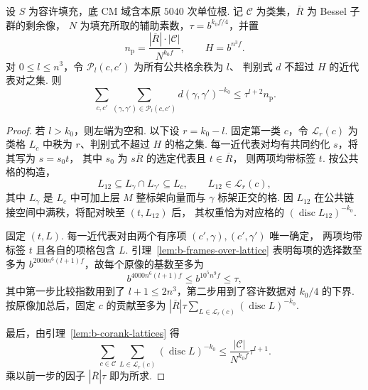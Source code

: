 \begin{lemma}[固定余秩的判别式负幂加权近代表对计数]
\label{lem:b-pair-disc-count}
\emitthmsource
设 $S$ 为容许填充，底 CM 域含本原 $5040$ 次单位根.
记 $\mathcal C$ 为类集，$\overline R$ 为 Bessel 子群的剩余像，
$N$ 为填充所取的辅助素数，$\tau=b^{k_0 f/4}$，并置
\[
 n_{\mathrm p}=\frac{|\overline R|\cdot|\mathcal C|}{N^{k_0 f}},
 \qquad H=b^{n^3 f}.
\]
对 $0\le l\le n^3$，令 $\mathcal P_l(c,c')$ 为所有公共格余秩为 $l$、
判别式 $d$ 不超过 $H$ 的近代表对之集. 则
\[
  \sum_{c,c'}\sum_{(\gamma,\gamma')\in \mathcal P_l(c,c')}
        d(\gamma,\gamma')^{-k_0}\le \tau^{l+2}n_{\mathrm p}.
\]
\end{lemma}
\begin{proof}
若 $l>k_0$，则左端为空和. 以下设 $r=k_0-l$.
固定第一类 $c$，令 $\mathcal L_r(c)$ 为类格 $L_c$ 中秩为 $r$、判别式不超过 $H$ 的格之集.
每一近代表对均有共同约化 $s$，将其写为 $s=s_0t$，
其中 $s_0$ 为 $s\overline R$ 的选定代表且 $t\in\overline R$，
则两项均带标签 $t$. 按公共格的构造，
\[
 L_{12}\subseteq L_\gamma\cap L_{\gamma'}\subseteq L_c,
 \qquad L_{12}\in\mathcal L_r(c),
\]
其中 $L_\gamma$ 是 $L_c$ 中可加上层 $M$ 整标架向量而与 $\gamma$ 标架正交的格.
因 $L_{12}$ 在公共链接空间中满秩，将配对映至 $(t,L_{12})$ 后，
其权重恰为对应格的 $(\operatorname{disc}L_{12})^{-k_0}$.

固定 $(t,L)$. 每一近代表对由两个有序项 $(c',\gamma),(c',\gamma')$ 唯一确定，
两项均带标签 $t$ 且各自的项格包含 $L$.
引理~\ref{lem:b-frames-over-lattice} 表明每项的选择数至多为
$b^{2000n^6(l+1)f}$，故每个原像的基数至多为
\[
 b^{4000n^6(l+1)f}\le b^{10^5n^9f}\le \tau,
\]
其中第一步比较指数用到了 $l+1\le2n^3$，第二步用到了容许数据对 $k_0/4$ 的下界.
按原像加总后，固定 $c$ 的贡献至多为
$|\overline R|\tau\sum_{L\in\mathcal L_r(c)}(\operatorname{disc}L)^{-k_0}$.

最后，由引理~\ref{lem:b-corank-lattices} 得
\[
 \sum_{c\in\mathcal C}\sum_{L\in\mathcal L_r(c)}
     (\operatorname{disc}L)^{-k_0}
 \le \frac{|\mathcal C|}{N^{k_0 f}}\tau^{l+1}.
\]
乘以前一步的因子 $|\overline R|\tau$ 即为所求.
\end{proof}

